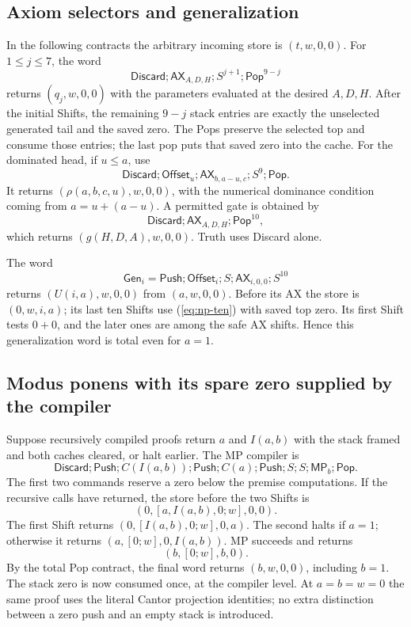 \subsection{Axiom selectors and generalization}

In the following contracts the arbitrary incoming store is $(t,w,0,0)$.
For $1\le j\le7$, the word
\[
 \mathsf{Discard};\mathsf{AX}_{A,D,H};S^{j+1};\mathsf{Pop}^{9-j}
\]
returns $(q_j,w,0,0)$ with the parameters evaluated at the desired
$A,D,H$. After the initial Shifts, the remaining $9-j$ stack entries
are exactly the unselected generated tail and the saved zero. The Pops
preserve the selected top and consume those entries; the last pop puts
that saved zero into the cache. For the dominated head, if $u\le a$,
use
\[
 \mathsf{Discard};\mathsf{Offset}_u;
 \mathsf{AX}_{b,a-u,c};S^9;\mathsf{Pop}.
\]
It returns $(\rho(a,b,c,u),w,0,0)$, with the numerical dominance condition
coming from $a=u+(a-u)$. A permitted gate is obtained by
\[
 \mathsf{Discard};\mathsf{AX}_{A,D,H};\mathsf{Pop}^{10},
\]
which returns $(g(H,D,A),w,0,0)$. Truth uses Discard alone.

The word
\[
 \mathsf{Gen}_i=\mathsf{Push};\mathsf{Offset}_i;S;
                \mathsf{AX}_{i,0,0};S^{10}
\]
returns $(U(i,a),w,0,0)$ from $(a,w,0,0)$. Before its AX the store is
$(0,w,i,a)$; its last ten Shifts use (\ref{eq:np-ten}) with saved top zero.
Its first Shift tests $0+0$, and the later ones are among the safe AX
shifts. Hence this generalization word is total even for $a=1$.

\subsection{Modus ponens with its spare zero supplied by the compiler}

Suppose recursively compiled proofs return $a$ and $I(a,b)$ with the
stack framed and both caches cleared, or halt earlier. The MP compiler is
\begin{equation}\label{eq:np-compile}
 \mathsf{Discard};\mathsf{Push};C(I(a,b));\mathsf{Push};
 C(a);\mathsf{Push};S;S;\mathsf{MP}_b;\mathsf{Pop}.
\end{equation}
The first two commands reserve a zero below the premise computations.
If the recursive calls have returned, the store before the two Shifts is
\[
             (0,[a,I(a,b),0;w],0,0).
\]
The first Shift returns $(0,[I(a,b),0;w],0,a)$.
The second halts if $a=1$; otherwise it returns
$(a,[0;w],0,I(a,b))$. MP succeeds and returns
\[
                         (b,[0;w],b,0).
\]
By the total Pop contract, the final word returns $(b,w,0,0)$, including
$b=1$. The stack zero is now consumed once, at the compiler level.
At $a=b=w=0$ the same proof uses the literal Cantor projection identities;
no extra distinction between a zero push and an empty stack is introduced.

